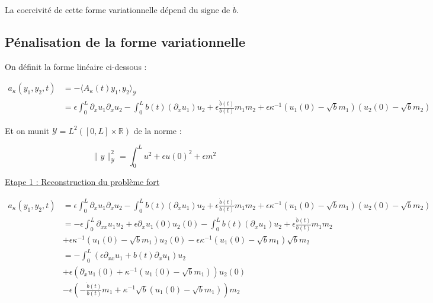 \documentclass[a4paper]{article}
\newcommand{\dep}{b}
\newcommand{\Y}{\mathscr{Y}}
\newcommand{\Ak}{A_{\kappa}}
\begin{document}
\begin{remarque}
	La coercivité de cette forme variationnelle dépend du signe de $\dot{b}$.
\end{remarque}

\subsection{Pénalisation de la forme variationnelle}

On définit la forme linéaire ci-dessous :

\[ 
\begin{split}
	a_\kappa(y_1,y_2,t) &= -\langle \Ak(t)y_1, y_2 \rangle_{\Y}\\
	             &= \epsilon \int_0^L \partial_xu_1 \partial_xu_2
  		              - \int_0^L \dep (t) (\partial_xu_1)u_2
                      +\epsilon \displaystyle \frac{\dot{\dep}(t)}{\dep(t)}m_1m_2
				      +\epsilon \kappa^{-1}(u_1(0)-\sqrt{\dep}m_1)(u_2(0)-\sqrt{\dep}m_2)
\end{split}
\]

Et on munit $\Y = L^2([0,L]\times \mathbb{R})$ de la norme :
  
    \[\| y\|_{\mathscr{Y}}^2 = \int_0^L u^2 + \epsilon u(0)^2 + \epsilon m^2 \]

\vspace{0.3cm}
\underline{Etape 1 : Reconstruction du problème fort}

\[
\begin{split}
	a_\kappa(y_1,y_2,t) &= \epsilon \int_0^L \partial_xu_1 \partial_xu_2
  		            - \int_0^L \dep (t) (\partial_xu_1)u_2
                    +\epsilon \displaystyle \frac{\dot{\dep}(t)}{\dep(t)}m_1m_2
				    + \epsilon \kappa^{-1}(u_1(0)-\sqrt{\dep}m_1)(u_2(0)-\sqrt{\dep}m_2)\\
				 &= - \epsilon \int_0^L \partial_{xx}u_1 u_2 
				    + \epsilon \partial_xu_1(0)u_2(0)
					- \int_0^L \dep (t) (\partial_xu_1)u_2
					+\epsilon \displaystyle \frac{\dot{\dep}(t)}{\dep(t)}m_1m_2\\
					& +\epsilon \kappa^{-1}(u_1(0)-\sqrt{\dep}m_1)u_2(0)
					-\epsilon \kappa^{-1}(u_1(0)-\sqrt{\dep}m_1) \sqrt{\dep}m_2\\
   				 &= -  \int_0^L (\epsilon \partial_{xx}u_1 +\dep (t)\partial_xu_1)u_2 \\
   				 & + \epsilon (\partial_xu_1(0) + \kappa^{-1}(u_1(0)-\sqrt{\dep}m_1)) u_2(0)\\
   				 & - \epsilon (-\displaystyle \frac{\dot{\dep}(t)}{\dep(t)}m_1
   					+ \kappa^{-1}\sqrt{\dep}(u_1(0)-\sqrt{\dep}m_1) )m_2
\end{split}
\]
\end{document}
